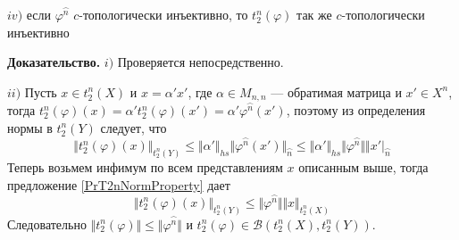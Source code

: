 \documentclass[12pt]{article}
\begin{document}
$iv)$  если $\varphi^{\wideparen{n}}$ $c$-топологически инъективно, то $t_2^n(\varphi)$ так же $c$-топологически инъективно


{\bf Доказательство.}
$i)$ Проверяется непосредственно. 

$ii)$ Пусть $x\in t_2^n(X)$ и $x=\alpha'x'$, где $\alpha\in M_{n,n}$ --- обратимая матрица и $x'\in X^{n}$, тогда $t_2^n(\varphi)(x)=\alpha't_2^n(\varphi)(x')=\alpha'\varphi^{\wideparen{n}}(x')$, поэтому из 
определения нормы в $t_2^n(Y)$ следует, что
$$
\Vert t_2^n(\varphi)(x)\Vert_{t_2^n(Y)}
\leq\Vert\alpha'\Vert_{hs}\Vert\varphi^{\wideparen{n}}(x')\Vert_{\wideparen{n}}
\leq\Vert\alpha'\Vert_{hs}\Vert\varphi^{\wideparen{n}}\Vert\Vert x'\vert_{\wideparen{n}}
$$
Теперь возьмем инфимум по всем представлениям $x$ описанным выше, тогда предложение \ref{PrT2nNormProperty} дает
$$
\Vert t_2^n(\varphi)(x)\Vert_{t_2^n(Y)}\leq\Vert\varphi^{\wideparen{n}}\Vert\Vert x\Vert_{t_2^n(X)}
$$
Следовательно $\Vert t_2^n(\varphi)\Vert\leq\Vert\varphi^{\wideparen{n}}\Vert$ и $t_2^n(\varphi)\in\mathcal{B}(t_2^n(X),t_2^n(Y))$.
\end{document}
